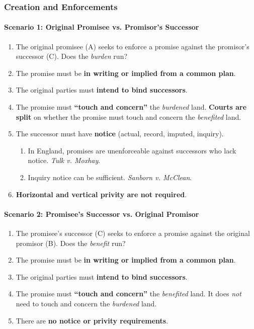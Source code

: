 \subsubsection{Creation and Enforcements}

\paragraph{Scenario 1: Original Promisee vs. Promisor's Successor}

\begin{enumerate}
    \item The original promisee (A) seeks to enforce a promise against the 
    promisor's  successor (C). Does the \emph{burden} run?
    \item The promise must be \textbf{in writing or implied from a common 
    plan}.
    \item The original parties must \textbf{intend to bind successors}.
    \item The promise must \textbf{``touch and concern''} the \emph{burdened} 
    land. \textbf{Courts are split} on whether the promise must touch and 
    concern the \emph{benefited} land.
    \item The successor must have \textbf{notice} (actual, record, imputed, 
    inquiry).
    \begin{enumerate}
        \item In England, promises are unenforceable against successors who 
        lack notice. \emph{Tulk v. Moxhay}.
        \item Inquiry notice can be sufficient. \emph{Sanborn v. McClean}.
    \end{enumerate}
    \item \textbf{Horizontal and vertical privity are not required}.
\end{enumerate}

\paragraph{Scenario 2: Promisee's Successor vs. Original Promisor}

\begin{enumerate}
    \item The promisee's successor (C) seeks to enforce a promise against the 
    original promisor (B). Does the \emph{benefit} run?
    \item The promise must be \textbf{in writing or implied from a common 
    plan}.
    \item The original parties must \textbf{intend to bind successors}.
    \item The promise must \textbf{``touch and concern''} the \emph{benefited} 
    land. It does \emph{not} need to touch and concern the \emph{burdened} 
    land.
    \item There are \textbf{no notice or privity requirements}.
\end{enumerate}

